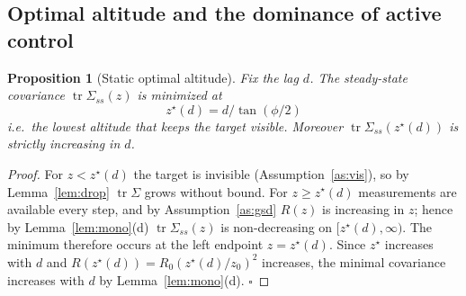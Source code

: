\documentclass[10pt]{article}
\newtheorem{proposition}{Proposition}
\theoremstyle{remark}\newtheorem{remark}{Remark}
\DeclareMathOperator{\tr}{tr}
\newcommand{\zstar}{z^{\star}}
\begin{document}
\subsection*{Optimal altitude and the dominance of active control}

\begin{proposition}[Static optimal altitude]\label{prop:A}
Fix the lag $d$. The steady-state covariance $\tr\Sigma_{ss}(z)$ is minimized at
\[
\boxed{\ \zstar(d)=d/\tan(\phi/2)\ }
\]
i.e.\ the lowest altitude that keeps the target visible. Moreover $\tr\Sigma_{ss}(\zstar(d))$
is strictly increasing in $d$.
\end{proposition}
\begin{proof}
For $z<\zstar(d)$ the target is invisible (Assumption~\ref{as:vis}), so by
Lemma~\ref{lem:drop} $\tr\Sigma$ grows without bound. For $z\ge \zstar(d)$ measurements are
available every step, and by Assumption~\ref{as:gsd} $R(z)$ is increasing in $z$; hence by
Lemma~\ref{lem:mono}(d) $\tr\Sigma_{ss}(z)$ is non-decreasing on $[\zstar(d),\infty)$. The
minimum therefore occurs at the left endpoint $z=\zstar(d)$. Since $\zstar$ increases with $d$
and $R(\zstar(d))=R_0(\zstar(d)/z_0)^2$ increases, the minimal covariance increases with $d$
by Lemma~\ref{lem:mono}(d). $\square$
\end{proof}
\end{document}
